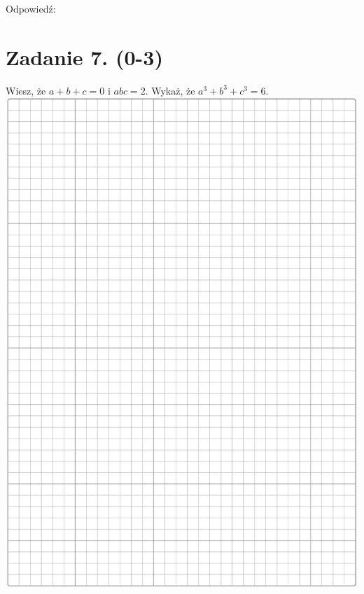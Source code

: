 \documentclass[10pt]{article}
\begin{document}
Odpowiedź: \(\qquad\)

\section*{Zadanie 7. (0-3)}
Wiesz, że \(a+b+c=0\) i \(a b c=2\). Wykaż, że \(a^{3}+b^{3}+c^{3}=6\).\\
\includegraphics[max width=\textwidth, center]{2024_11_21_e30d1f37bf0e3631c088g-06}
\end{document}
